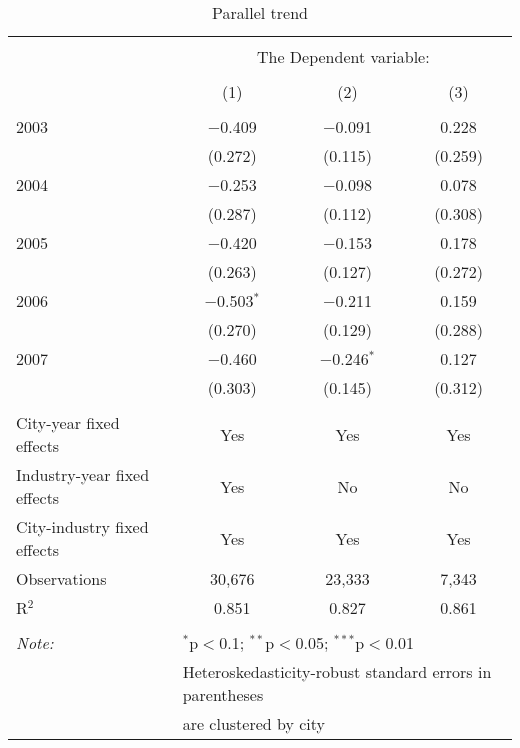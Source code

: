 
\begin{table}[!htbp] \centering
  \caption{Parallel trend}
  \label{}
\begin{tabular}{@{\extracolsep{5pt}}lccc}
\\[-1.8ex]\hline
\hline \\[-1.8ex]
 & \multicolumn{3}{c}{The Dependent variable:} \\
\cline{2-4}
\\[-1.8ex] & (1) & (2) & (3)\\
\hline \\[-1.8ex]
  2003 & $-$0.409 & $-$0.091 & 0.228 \\ 
  & (0.272) & (0.115) & (0.259) \\
  2004 & $-$0.253 & $-$0.098 & 0.078 \\
  & (0.287) & (0.112) & (0.308) \\
  2005 & $-$0.420 & $-$0.153 & 0.178 \\
  & (0.263) & (0.127) & (0.272) \\
  2006 & $-$0.503$^{*}$ & $-$0.211 & 0.159 \\
  & (0.270) & (0.129) & (0.288) \\
  2007 & $-$0.460 & $-$0.246$^{*}$ & 0.127 \\
  & (0.303) & (0.145) & (0.312) \\
 \hline \\[-1.8ex]
City-year fixed effects & Yes & Yes & Yes \\
Industry-year fixed effects & Yes & No & No \\
City-industry fixed effects & Yes & Yes & Yes \\
Observations & 30,676 & 23,333 & 7,343 \\
R$^{2}$ & 0.851 & 0.827 & 0.861 \\
\hline
\hline \\[-1.8ex]
\textit{Note:}  & \multicolumn{3}{l}{$^{*}$p$<$0.1; $^{**}$p$<$0.05; $^{***}$p$<$0.01} \\
 & \multicolumn{3}{l}{Heteroskedasticity-robust standard errors in parentheses} \\
 & \multicolumn{3}{l}{are clustered by city} \\
\end{tabular}
\end{table}
